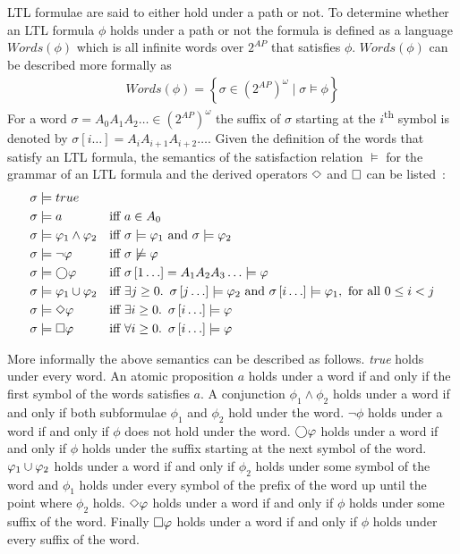 LTL formulae are said to either hold under a path or not. To determine whether an LTL formula $\phi$ holds under a path or not the formula is defined as a language $\mathit{Words}(\phi)$ which is all infinite words over $2^{AP}$ that satisfies $\phi$. $\mathit{Words}(\phi)$ can be described more formally as~\cite[Def.~5.6]{baier2008principles}
\begin{align*}
    \mathit{Words}(\phi) = \left\{ \sigma \in \left( 2^{AP} \right)^\omega \mid \sigma \models \phi \right\}
\end{align*}
For a word $\sigma = A_0 A_1 A_2 \ldots \in \left( 2^{AP} \right)^\omega$ the suffix of $\sigma$ starting at the $i$\textsuperscript{th} symbol is denoted by $\sigma \left[ i \ldots \right] = A_i A_{i+1} A_{i+2} \ldots$. Given the definition of the words that satisfy an LTL formula, the semantics of the satisfaction relation $\models$ for the grammar of an LTL formula and the derived operators $\Diamond$ and $\square$ can be listed~\cite[Fig.~5.2]{baier2008principles}:
\begin{align}
    \sigma &\models true                && \label{eq:sem-true}\\
    \sigma &\models a                   &\text{iff }& a \in A_0 \\
    \sigma &\models \varphi_1 \land \varphi_2 &\text{iff }& \sigma \models \varphi_1 \text{ and } \sigma \models \varphi_2 \\
    \sigma &\models \lnot \varphi          &\text{iff }& \sigma \not\models \varphi\\
    \sigma &\models \bigcirc \varphi             &\text{iff }& \sigma\left[1\ldots\right] = A_1 A_2 A_3\ldots \models \varphi\\
    \sigma &\models \varphi_1 \cup \varphi_2    &\text{iff }& \exists j \geq 0.\enskip \sigma\left[j\ldots\right] \models \varphi_2 \text{ and } \sigma\left[i\ldots\right] \models \varphi_1, \text{ for all } 0 \leq i < j \\
    \sigma &\models \Diamond \varphi             &\text{iff }& \exists i \geq 0.\enskip \sigma\left[i\ldots\right] \models \varphi \label{eq:sem-eventually} \\ 
    \sigma &\models \square \varphi             &\text{iff }& \forall i \geq 0.\enskip \sigma\left[i\ldots\right] \models \varphi \label{eq:sem-always}
\end{align}

More informally the above semantics can be described as follows. \emph{true} holds under every word. An atomic proposition $a$ holds under a word if and only if the first symbol of the words satisfies $a$. A conjunction $\phi_1 \land \phi_2$ holds under a word if and only if both subformulae $\phi_1$ and $\phi_2$ hold under the word. $\lnot \phi$ holds under a word if and only if $\phi$ does not hold under the word. $\bigcirc\varphi$ holds under a word if and only if $\phi$ holds under the suffix starting at the next symbol of the word. $\varphi_1 \cup \varphi_2$ holds under a word if and only if $\phi_2$ holds under some symbol of the word and $\phi_1$ holds under every symbol of the prefix of the word up until the point where $\phi_2$ holds. $\Diamond \varphi$ holds under a word if and only if $\phi$ holds under some suffix of the word. Finally $\square \varphi$ holds under a word if and only if $\phi$ holds under every suffix of the word.

